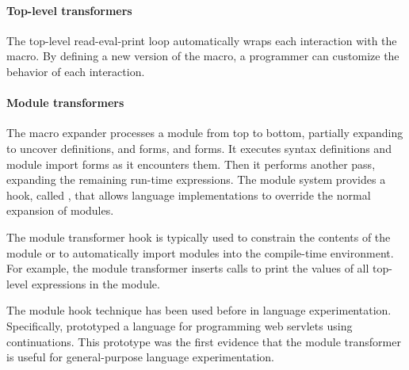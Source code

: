 \begin{schemeregion}
\paragraph{Top-level transformers}

The top-level read-eval-print loop automatically wraps each interaction with the
 macro. By defining a new version of the
 macro, a programmer can customize the
behavior of each interaction.

\paragraph{Module transformers}

The macro expander processes a module from top to bottom,
partially expanding to uncover definitions,  and
 forms, and  forms. It
executes syntax definitions and module import forms as it encounters
them. Then it performs another pass, expanding the remaining run-time
expressions.
%
The module system provides a hook, called ,
that allows language implementations to override the normal expansion
of modules.

The module transformer hook is typically used to constrain the
contents of the module or to automatically import modules into the
compile-time environment. For example, the  module
transformer inserts calls to print the values of all top-level
expressions in the module.

The module hook technique has been used before in language
experimentation. Specifically, \citet{pcmkf:continuations} prototyped a language for
programming web servlets using continuations. This prototype was the
first evidence that the module transformer is useful for
general-purpose language experimentation.
%




\end{schemeregion}
